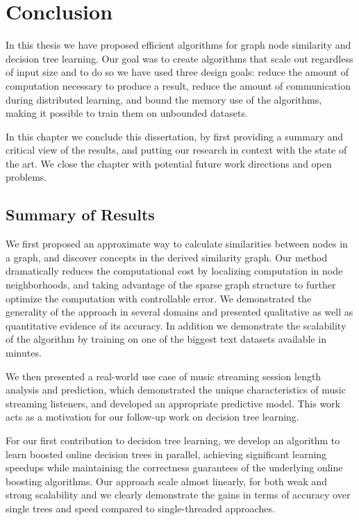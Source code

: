 \chapter{Conclusion}

In this thesis we have proposed efficient algorithms for graph node
similarity and decision tree learning. Our goal was to create
algorithms that scale out regardless of input size and to do so
we have used three design goals: reduce the amount of computation
necessary to produce a result, reduce the amount of communication
during distributed learning, and bound the memory use of the algorithms,
making it possible to train them on unbounded datasets.

In this chapter we conclude this dissertation, by first providing a
summary and critical view of the results, and putting our research
in context with the state of the art.
We close the chapter with potential future work directions and open
problems.

\section{Summary of Results}

We first proposed an approximate way to calculate similarities between
nodes in a graph, and discover concepts in the derived similarity
graph. Our method dramatically reduces the computational cost
by localizing computation in node neighborhoods, and taking advantage
of the sparse graph structure to further optimize the computation with controllable
error. We demonstrated the generality of the approach in several domains and presented
qualitative as well as quantitative evidence of its accuracy. In addition we demonstrate
the scalability of the algorithm by training on one of the biggest text datasets
available in minutes.

We then presented a real-world use case of music streaming session length analysis and prediction,
which demonstrated the unique characteristics of music streaming listeners, and developed
an appropriate predictive model. This work acts as a motivation for our follow-up work
on decision tree learning.

For our first contribution to decision tree learning, we develop an algorithm
to learn boosted online decision trees in parallel, achieving significant
learning speedups while maintaining the correctness guarantees of the
underlying online boosting algorithms. Our approach scale almost linearly,
for both weak and strong scalability and we clearly demonstrate the gains
in terms of accuracy over single trees and speed compared to single-threaded
approaches.


